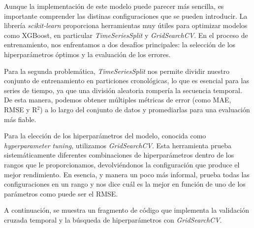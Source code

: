 Aunque la implementación de este modelo puede parecer más sencilla, es importante comprender las distinas configuraciones que se pueden introducir. La librería \textit{scikit-learn} proporciona herramientas muy útiles para optimizar modelos como XGBoost, en particular \textit{TimeSeriesSplit} y \textit{GridSearchCV}. En el proceso de entrenamiento, nos enfrentamos a dos desafíos principales: la selección de los hiperparámetros óptimos y la evaluación de los errores.

Para la segunda problemática, \textit{TimeSeriesSplit} nos permite dividir nuestro conjunto de entrenamiento en particiones cronológicas, lo que es esencial para las series de tiempo, ya que una división aleatoria rompería la secuencia temporal. De esta manera, podemos obtener múltiples métricas de error (como MAE, RMSE y R$^2$) a lo largo del conjunto de datos y promediarlas para una evaluación más fiable.

Para la elección de los hiperparámetros del modelo, conocida como \textit{hyperparameter tuning}, utilizamos \textit{GridSearchCV}. Esta herramienta prueba sistemáticamente diferentes combinaciones de hiperparámetros dentro de los rangos que le proporcionamos, devolviéndonos la configuración que produce el mejor rendimiento. En esencia, y manera un poco más informal, prueba todas las configuraciones en un rango y nos dice cuál es la mejor en función de uno de los parámetros como puede ser el RMSE.

A continuación, se muestra un fragmento de código que implementa la validación cruzada temporal y la búsqueda de hiperparámetros con \textit{GridSearchCV}.

